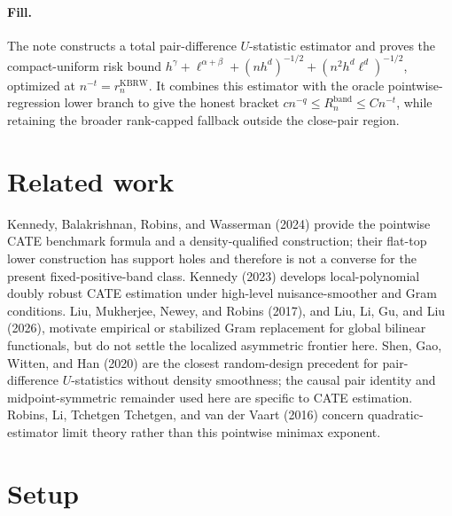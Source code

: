 \documentclass{article}
\begin{document}
\paragraph{Fill.} The note constructs a total pair-difference \(U\)-statistic estimator and proves the compact-uniform risk bound \(h^\gamma+\ell^{\alpha+\beta}+(nh^d)^{-1/2}+(n^2h^d\ell^d)^{-1/2}\), optimized at \(n^{-t}=r_n^{\mathrm{KBRW}}\).  It combines this estimator with the oracle pointwise-regression lower branch to give the honest bracket \(c n^{-q}\leq R_n^{\mathrm{band}}\leq Cn^{-t}\), while retaining the broader rank-capped fallback outside the close-pair region.

\section{Related work}

Kennedy, Balakrishnan, Robins, and Wasserman (2024) provide the pointwise CATE benchmark formula and a density-qualified construction; their flat-top lower construction has support holes and therefore is not a converse for the present fixed-positive-band class.  Kennedy (2023) develops local-polynomial doubly robust CATE estimation under high-level nuisance-smoother and Gram conditions.  Liu, Mukherjee, Newey, and Robins (2017), and Liu, Li, Gu, and Liu (2026), motivate empirical or stabilized Gram replacement for global bilinear functionals, but do not settle the localized asymmetric frontier here.  Shen, Gao, Witten, and Han (2020) are the closest random-design precedent for pair-difference \(U\)-statistics without density smoothness; the causal pair identity and midpoint-symmetric remainder used here are specific to CATE estimation.  Robins, Li, Tchetgen Tchetgen, and van der Vaart (2016) concern quadratic-estimator limit theory rather than this pointwise minimax exponent.

\section{Setup}
\end{document}
